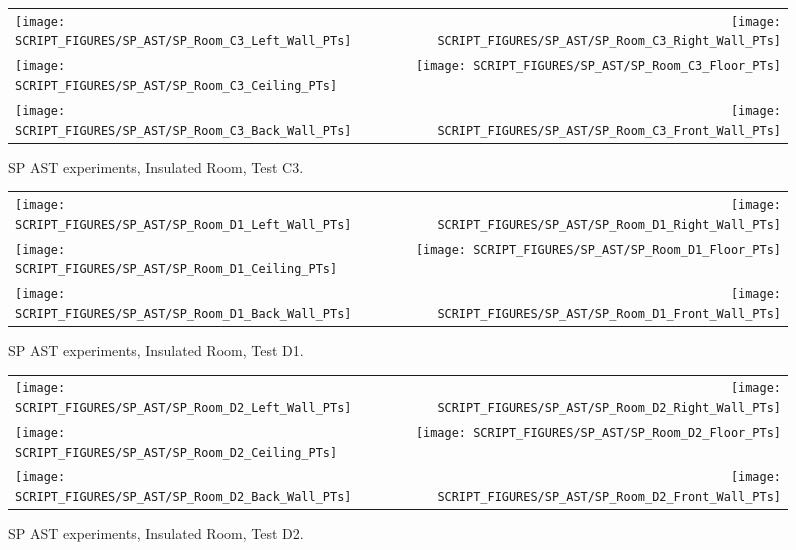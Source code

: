 \begin{figure}[p]
\begin{tabular*}{\textwidth}{l@{\extracolsep{\fill}}r}
\texttt{[image: SCRIPT\_FIGURES/SP\_AST/SP\_Room\_C3\_Left\_Wall\_PTs]} &  \texttt{[image: SCRIPT\_FIGURES/SP\_AST/SP\_Room\_C3\_Right\_Wall\_PTs]}  \\
\texttt{[image: SCRIPT\_FIGURES/SP\_AST/SP\_Room\_C3\_Ceiling\_PTs]}   &  \texttt{[image: SCRIPT\_FIGURES/SP\_AST/SP\_Room\_C3\_Floor\_PTs]}  \\
\texttt{[image: SCRIPT\_FIGURES/SP\_AST/SP\_Room\_C3\_Back\_Wall\_PTs]} &  \texttt{[image: SCRIPT\_FIGURES/SP\_AST/SP\_Room\_C3\_Front\_Wall\_PTs]}
\end{tabular*}
\caption{SP AST experiments, Insulated Room, Test C3.}
\label{SP_Room_C3_PTs}
\end{figure}

\begin{figure}[p]
\begin{tabular*}{\textwidth}{l@{\extracolsep{\fill}}r}
\texttt{[image: SCRIPT\_FIGURES/SP\_AST/SP\_Room\_D1\_Left\_Wall\_PTs]} &  \texttt{[image: SCRIPT\_FIGURES/SP\_AST/SP\_Room\_D1\_Right\_Wall\_PTs]}  \\
\texttt{[image: SCRIPT\_FIGURES/SP\_AST/SP\_Room\_D1\_Ceiling\_PTs]}   &  \texttt{[image: SCRIPT\_FIGURES/SP\_AST/SP\_Room\_D1\_Floor\_PTs]}  \\
\texttt{[image: SCRIPT\_FIGURES/SP\_AST/SP\_Room\_D1\_Back\_Wall\_PTs]} &  \texttt{[image: SCRIPT\_FIGURES/SP\_AST/SP\_Room\_D1\_Front\_Wall\_PTs]}
\end{tabular*}
\caption{SP AST experiments, Insulated Room, Test D1.}
\label{SP_Room_D1_PTs}
\end{figure}

\begin{figure}[p]
\begin{tabular*}{\textwidth}{l@{\extracolsep{\fill}}r}
\texttt{[image: SCRIPT\_FIGURES/SP\_AST/SP\_Room\_D2\_Left\_Wall\_PTs]} &  \texttt{[image: SCRIPT\_FIGURES/SP\_AST/SP\_Room\_D2\_Right\_Wall\_PTs]}  \\
\texttt{[image: SCRIPT\_FIGURES/SP\_AST/SP\_Room\_D2\_Ceiling\_PTs]}   &  \texttt{[image: SCRIPT\_FIGURES/SP\_AST/SP\_Room\_D2\_Floor\_PTs]}  \\
\texttt{[image: SCRIPT\_FIGURES/SP\_AST/SP\_Room\_D2\_Back\_Wall\_PTs]} &  \texttt{[image: SCRIPT\_FIGURES/SP\_AST/SP\_Room\_D2\_Front\_Wall\_PTs]}
\end{tabular*}
\caption{SP AST experiments, Insulated Room, Test D2.}
\label{SP_Room_D2_PTs}
\end{figure}


